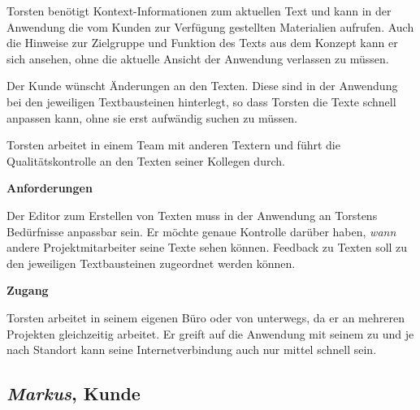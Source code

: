 \begin{multicols}{2}
Torsten benötigt Kontext-Informationen zum aktuellen Text und kann in der Anwendung die vom Kunden zur Verfügung gestellten Materialien aufrufen. Auch die Hinweise zur Zielgruppe und Funktion des Texts aus dem Konzept kann er sich ansehen, ohne die aktuelle Ansicht der Anwendung verlassen zu müssen.

Der Kunde wünscht Änderungen an den Texten. Diese sind in der Anwendung bei den jeweiligen Textbausteinen hinterlegt, so dass Torsten die Texte schnell anpassen kann, ohne sie erst aufwändig suchen zu müssen.

Torsten arbeitet in einem Team mit anderen Textern und führt die Qualitätskontrolle an den Texten seiner Kollegen durch.

\textbf{Anforderungen}

Der Editor zum Erstellen von Texten muss in der Anwendung an Torstens Bedürfnisse anpassbar sein. Er möchte genaue Kontrolle darüber haben, \emph{wann} andere Projektmitarbeiter seine Texte sehen können. Feedback zu Texten soll zu den jeweiligen Textbausteinen zugeordnet werden können.

\textbf{Zugang}

Torsten arbeitet in seinem eigenen Büro oder von unterwegs, da er an mehreren Projekten gleichzeitig arbeitet. Er greift auf die Anwendung mit seinem  zu und je nach Standort kann seine Internetverbindung auch nur mittel schnell sein.

\end{multicols}

\pagebreak

\subsection{\emph{Markus}, Kunde}\label{p:markus}

